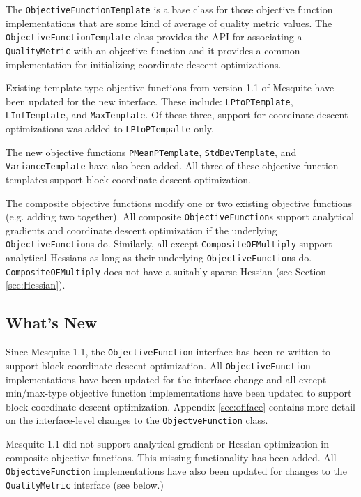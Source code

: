 \documentclass{article}
\begin{document}
The \texttt{ObjectiveFunctionTemplate} is a base class for those objective function implementations that are some kind of average of quality metric values.  The \texttt{ObjectiveFunctionTemplate} class provides the API for associating a \texttt{QualityMetric} with an objective function and it provides a common implementation for initializing coordinate descent optimizations.

Existing template-type objective functions from version 1.1 of Mesquite have been updated for the new interface.  These include: \texttt{LPtoPTemplate}, \texttt{LInfTemplate}, and \texttt{MaxTemplate}.  Of these three, support for coordinate descent optimizations was added to \texttt{LPtoPTempalte} only.

The new objective functions \texttt{PMeanPTemplate}, \texttt{StdDevTemplate}, and \texttt{VarianceTemplate} have also been added.  All three of these objective function templates support block coordinate descent optimization.   

The composite objective functions modify one or two existing objective functions (e.g. adding two together).  All composite \texttt{ObjectiveFunction}s support analytical gradients and coordinate descent optimization if the underlying \texttt{ObjectiveFunction}s do.  Similarly, all except \texttt{CompositeOFMultiply} support analytical Hessians as long as their underlying \texttt{ObjectiveFunction}s do.  \texttt{CompositeOFMultiply} does not have a suitably sparse Hessian (see Section \ref{sec:Hessian}).

\subsection{What's New}

Since Mesquite 1.1, the \texttt{ObjectiveFunction} interface has been re-written to support block coordinate descent optimization.  All \texttt{ObjectiveFunction} implementations have been updated for the interface change and all except min/max-type objective function implementations have been updated to support block coordinate descent optimization.  Appendix \ref{sec:ofiface} contains more detail on the interface-level changes to the \texttt{ObjectveFunction} class.

Mesquite 1.1 did not support analytical gradient or Hessian optimization in composite objective functions.  This missing functionality has been added.  All \texttt{ObjectiveFunction} implementations have also been updated for changes to the \texttt{QualityMetric} interface (see below.)
\end{document}
